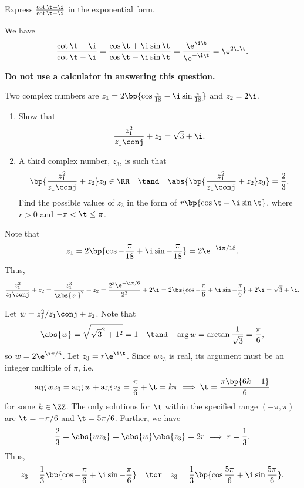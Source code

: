 \begin{problem}
    Express $\frac{\cot \t + \i}{\cot \t - \i}$ in the exponential form.
\end{problem}
\begin{solution}
    We have \[\frac{\cot \t + \i}{\cot \t - \i} = \frac{\cos \t + \i \sin \t}{\cos \t - \i \sin \t} = \frac{\e^{\i\t}}{\e^{-\i\t}} = \e^{2\i \t}.\]
\end{solution}

\begin{problem}
    \textbf{Do not use a calculator in answering this question.}

    Two complex numbers are $z_1 = 2\bp{\cos \frac\pi{18} - \i \sin \frac\pi{18}}$ and $z_2 = 2\i$.

    \begin{enumerate}
        \item Show that \[\frac{z_1^2}{z_1\conj} + z_2 = \sqrt3 + \i.\]
        \item A third complex number, $z_3$, is such that \[\bp{\frac{z_1^2}{z_1\conj} + z_2} z_3 \in \RR \quad \tand \quad \abs{\bp{\frac{z_1^2}{z_1\conj} + z_2} z_3} = \frac23.\] Find the possible values of $z_3$ in the form of $r\bp{\cos \t + \i \sin \t}$, where $r > 0$ and $-\pi < \t \leq \pi$.
    \end{enumerate}
\end{problem}
\begin{solution}
    \begin{ppart}
        Note that \[z_1 = 2\bp{\cos{-\frac\pi{18}} + \i \sin{-\frac\pi{18}}} = 2\e^{-\i \pi /18}.\] Thus, \[\frac{z_1^2}{z_1\conj} + z_2 = \frac{z_1^3}{\abs{z_1}^2} + z_2 = \frac{2^3 \e^{-\i \pi/6}}{2^2} + 2\i = 2\bs{\cos{-\frac\pi6} + \i \sin{-\frac\pi6}} + 2\i = \sqrt{3} + \i.\]
    \end{ppart}
    \begin{ppart}
        Let $w = z_1^2/z_1\conj + z_2$. Note that \[\abs{w} = \sqrt{\sqrt{3}^2 + 1^2} = 1 \quad \tand \quad \arg{w} = \arctan{\frac1{\sqrt3}} = \frac\pi6,\] so $w = 2\e^{\i \pi /6}$. Let $z_3 = r\e^{\i \t}$. Since $wz_3$ is real, its argument must be an integer multiple of $\pi$, i.e. \[\arg{w z_3} = \arg{w} + \arg{z_3} = \frac\pi6 + \t = k\pi \implies \t = \frac{\pi \bp{6k - 1}}{6}\] for some $k \in \ZZ$. The only solutions for $\t$ within the specified range $(-\pi, \pi)$ are $\t = -\pi/6$ and $\t = 5\pi/6$. Further, we have \[\frac23 = \abs{wz_3} = \abs{w}\abs{z_3} = 2r \implies r = \frac13.\] Thus, \[z_3 = \frac13 \bp{\cos{-\frac\pi6} + \i \sin{-\frac\pi6}} \quad \tor \quad z_3 = \frac13 \bp{\cos \frac{5\pi}6 + \i \sin \frac{5\pi}6}.\]
    \end{ppart}
\end{solution}

